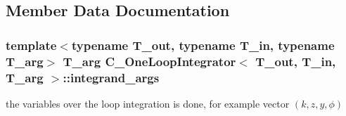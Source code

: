\subsection{Member Data Documentation}
\hypertarget{class_c___one_loop_integrator_a196a8d045623e4af5d4bb9fca7c105bb}{
\subsubsection[{integrand\-\_\-args}]{\setlength{\rightskip}{0pt plus 5cm}template$<$typename T\-\_\-out, typename T\-\_\-in, typename T\-\_\-arg$>$ T\-\_\-arg {\bf C\-\_\-\-One\-Loop\-Integrator}$<$ T\-\_\-out, T\-\_\-in, T\-\_\-arg $>$\-::integrand\-\_\-args\hspace{0.3cm}{\ttfamily [protected]}}}\label{class_c___one_loop_integrator_a196a8d045623e4af5d4bb9fca7c105bb}


the variables over the loop integration is done, for example vector $ (k,z,y,\phi) $ 

